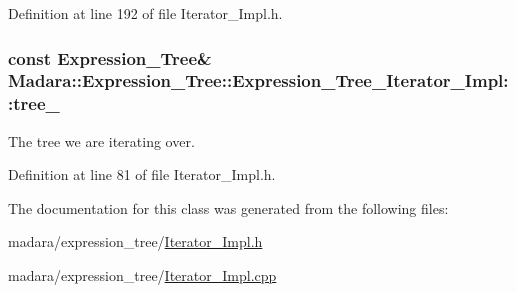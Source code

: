 Definition at line 192 of file Iterator\_\-Impl.h.

\hypertarget{classMadara_1_1Expression__Tree_1_1Expression__Tree__Iterator__Impl_a4b369e3fcfc62405321ece1d46719f93}{
\subsubsection[{tree\_\-}]{\setlength{\rightskip}{0pt plus 5cm}const {\bf Expression\_\-Tree}\& {\bf Madara::Expression\_\-Tree::Expression\_\-Tree\_\-Iterator\_\-Impl::tree\_\-}}}
\label{d0/dd7/classMadara_1_1Expression__Tree_1_1Expression__Tree__Iterator__Impl_a4b369e3fcfc62405321ece1d46719f93}


The tree we are iterating over. 



Definition at line 81 of file Iterator\_\-Impl.h.



The documentation for this class was generated from the following files:\begin{DoxyCompactItemize}
\item 
madara/expression\_\-tree/\hyperlink{Iterator__Impl_8h}{Iterator\_\-Impl.h}\item 
madara/expression\_\-tree/\hyperlink{Iterator__Impl_8cpp}{Iterator\_\-Impl.cpp}\end{DoxyCompactItemize}
